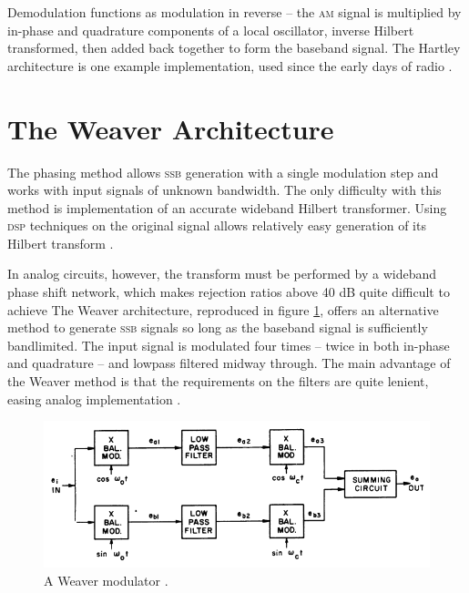 \documentclass[12pt]{article}
\newcommand{\rf}{\textsc{am}\xspace}
\newcommand{\ssb}{\textsc{ssb}\xspace}
\begin{document}
Demodulation functions as modulation in reverse -- the \rf signal is multiplied
by in-phase and quadrature components of a local oscillator, inverse Hilbert
transformed, then added back together to form the baseband signal. The Hartley
architecture is one example implementation, used since the early days of radio
\autocite{rf-microelectronics}.

\section{The Weaver Architecture}

\newcommand{\oo}{\omega_o}
\newcommand{\oc}{\omega_c}

The phasing method allows \ssb generation with a single modulation step and
works with input signals of unknown bandwidth. The only difficulty with this
method is implementation of an accurate wideband Hilbert transformer. Using
\textsc{dsp} techniques on the original signal allows relatively easy
generation of its Hilbert transform \autocite{ssb-tretter}.

In analog circuits, however, the transform must be performed by a wideband
phase shift network, which makes rejection ratios above 40 dB quite difficult
to achieve The Weaver architecture, reproduced in figure
\ref{fig:weaver-from-paper}, offers an alternative method to generate \ssb
signals so long as the baseband signal is sufficiently bandlimited. The input
signal is modulated four times -- twice in both in-phase and quadrature -- and
lowpass filtered midway through. The main advantage of the Weaver method is
that the requirements on the filters are quite lenient, easing analog
implementation \autocite{weaver-himself}.

\begin{figure}[h]
	\centering
	\includegraphics[width=.9\textwidth]{weaver-from-paper.png}
	\caption{A Weaver modulator \autocite{weaver-himself}.}
	\label{fig:weaver-from-paper}
\end{figure}
\end{document}
